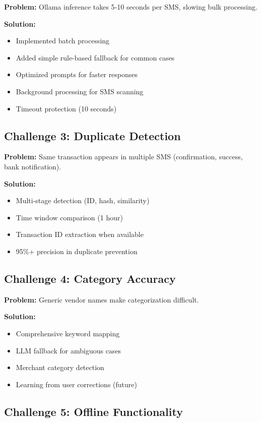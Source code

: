 \documentclass[11pt,a4paper]{report}
\begin{document}
\textbf{Problem:} Ollama inference takes 5-10 seconds per SMS, slowing bulk processing.

\textbf{Solution:}
\begin{itemize}
    \item Implemented batch processing
    \item Added simple rule-based fallback for common cases
    \item Optimized prompts for faster responses
    \item Background processing for SMS scanning
    \item Timeout protection (10 seconds)
\end{itemize}

\subsection{Challenge 3: Duplicate Detection}

\textbf{Problem:} Same transaction appears in multiple SMS (confirmation, success, bank notification).

\textbf{Solution:}
\begin{itemize}
    \item Multi-stage detection (ID, hash, similarity)
    \item Time window comparison (1 hour)
    \item Transaction ID extraction when available
    \item 95\%+ precision in duplicate prevention
\end{itemize}

\subsection{Challenge 4: Category Accuracy}

\textbf{Problem:} Generic vendor names make categorization difficult.

\textbf{Solution:}
\begin{itemize}
    \item Comprehensive keyword mapping
    \item LLM fallback for ambiguous cases
    \item Merchant category detection
    \item Learning from user corrections (future)
\end{itemize}

\subsection{Challenge 5: Offline Functionality}
\end{document}
